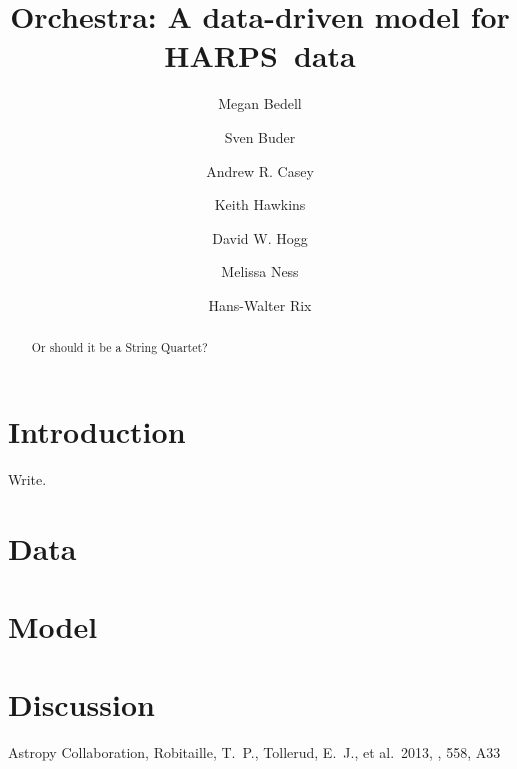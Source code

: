 \documentclass{aastex61}
\newcommand{\acronym}[1]{{\small{#1}}}
\newcommand{\harps}{\acronym{HARPS}}
\begin{document}
\title{Orchestra: A data-driven model for \harps\ data}

\author{Megan Bedell}
\author{Sven Buder}
\author[0000-0003-0174-0564]{Andrew R. Casey}
\author{Keith Hawkins}
\author{David W. Hogg}
\author{Melissa Ness}
\author{Hans-Walter Rix}



\begin{abstract}
Or should it be a String Quartet?
\end{abstract}

\keywords{}

\section{Introduction} 
\label{sec:introduction}
Write.


\section{Data}
\label{sec:observations}


\section{Model}
\label{sec:model}



\section{Discussion}
\label{sec:discussion}


\acknowledgments



\begin{thebibliography}{}

 Astropy Collaboration, Robitaille, T.~P., Tollerud, E.~J., et al.\ 2013, \aap, 558, A33 

\end{thebibliography}
\end{document}
